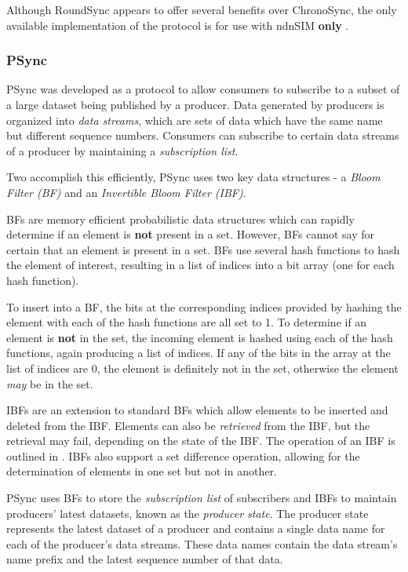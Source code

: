 Although RoundSync appears to offer several benefits over ChronoSync, the only available implementation of the protocol is for use with ndnSIM \textbf{only} \cite{roundsync-github}.

\subsubsection*{PSync}
PSync was developed as a protocol to allow consumers to subscribe to a subset of a large dataset being published by a producer. Data generated by producers is organized into \textit{data streams}, which are sets of data which have the same name but different sequence numbers. Consumers can subscribe to certain data streams of a producer by maintaining a \textit{subscription list}.

Two accomplish this efficiently, PSync uses two key data structures - a \textit{Bloom Filter (BF)} and an \textit{Invertible Bloom Filter (IBF)}. 

BFs are memory efficient probabilistic data structures which can rapidly determine if an element is \textbf{not} present in a set. However, BFs cannot say for certain that an element is present in a set. BFs use several hash functions to hash the element of interest, resulting in a list of indices into a bit array (one for each hash function). 

To insert into a BF, the bits at the corresponding indices provided by hashing the element with each of the hash functions are all set to 1. To determine if an element is \textbf{not} in the set, the incoming element is hashed using each of the hash functions, again producing a list of indices. If any of the bits in the array at the list of indices are 0, the element is definitely not in the set, otherwise the element \textit{may} be in the set. 

IBFs are an extension to standard BFs which allow elements to be inserted and deleted from the IBF. Elements can also be \textit{retrieved} from the IBF, but the retrieval may fail, depending on the state of the IBF. The operation of an IBF is outlined in . IBFs also support a set difference operation, allowing for the determination of elements in one set but not in another. 

PSync uses BFs to store the \textit{subscription list} of subscribers and IBFs to maintain producers' latest datasets, known as the \textit{producer state}. The producer state represents the latest dataset of a producer and contains a single data name for each of the producer's data streams. These data names contain the data stream's name prefix and the latest sequence number of that data.  

